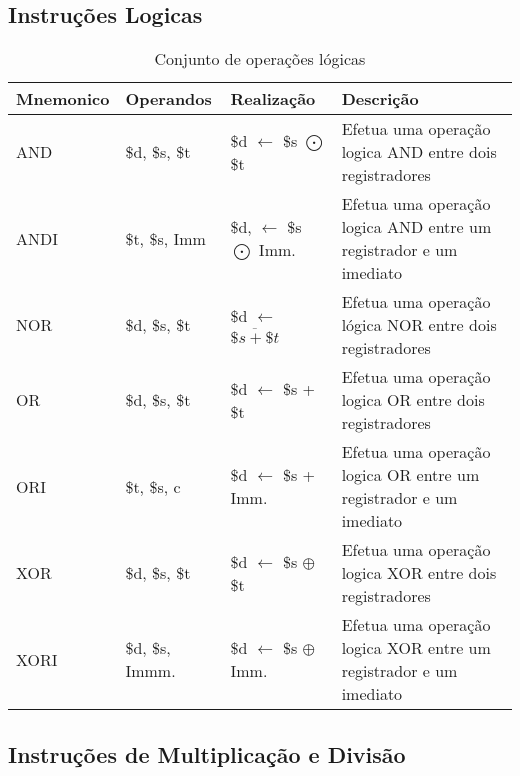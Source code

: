 \documentclass{report}
\begin{document}
  \subsection{Instruções Logicas}
    
    \FloatBarrier
    \begin{table}[H]
      \begin{center}
        \begin{tabular}[pos]{|m{2.8cm}|m{2.8cm}|m{3cm}|m{4cm}|} 
          \hline
          \cellcolor[gray]{0.9}\textbf{Mnemonico} & \cellcolor[gray]{0.9}\textbf{Operandos} & \cellcolor[gray]{0.9}\textbf{Realização} & \cellcolor[gray]{0.9}\textbf{Descrição} \\ \hline
              AND  & \$d, \$s, \$t & \$d $\leftarrow$ \$s $\bigodot$ \$t &  Efetua uma operação logica AND entre dois registradores\\ \hline 
              ANDI  &  \$t, \$s, Imm & \$d, $\leftarrow$ \$s $\bigodot$ Imm. &  Efetua uma operação logica AND entre um registrador e um imediato\\ \hline 
              NOR  & \$d, \$s, \$t & \$d $\leftarrow$ $\overline{\$s + \$t}$ &  Efetua uma operação lógica NOR entre dois registradores\\ \hline
              OR  & \$d, \$s, \$t & \$d $\leftarrow$ \$s + \$t & Efetua uma operação logica OR entre dois registradores  \\ \hline
              ORI  & \$t, \$s, c & \$d $\leftarrow$ \$s + Imm. &  Efetua uma operação logica OR entre um registrador e um imediato\\ \hline
              XOR  &  \$d, \$s, \$t &  \$d $\leftarrow$ \$s $\oplus$ \$t &  Efetua uma operação logica XOR entre dois registradores \\ \hline
              XORI  & \$d, \$s, Immm. & \$d $\leftarrow$ \$s $\oplus$ Imm. &  Efetua uma operação logica XOR entre um registrador e um imediato\\ \hline

        \end{tabular}
        \caption{Conjunto de operações lógicas}
		\label{table:conjOpLog}
      \end{center}
    \end{table}
      \subsection{Instruções de Multiplicação e Divisão}
\end{document}
